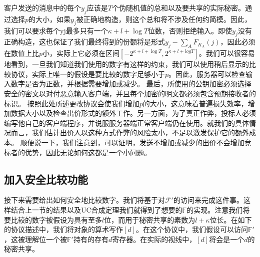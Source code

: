 客户发送的消息中的每个$y_j$应该是$T$个伪随机值的总和以及要共享的实际秘密。通过选择$p$的大小，如果$y_j$被正确地构造，则这个总和将不涉及任何约简模。因此，我们可以要求每个yj最多只有一个$\kappa+l+\log T$位数，否则拒绝输入。即使$y_j$没有正确构造，这也保证了我们最终得到的份额将是形式$y_j-\sum_{A}F_{K_A}(j)$，因此必须在数值上比$p$小，实际上它必须在区间$[-2^{\kappa+l+\log T},2^{\kappa+l+log T}]$。我们可以很容易地看到，一旦我们知道我们使用的数字有这样的约束，我们可以使用稍后显示的比较协议，实际上唯一的假设是要比较的数字足够小于$p$。因此，服务器可以检查输入数字是否为正数，并根据需要增加或减少。
最后，所使用的公钥加密必须选择安全的密文以对付恶意输入客户端，并且每个加密的明文都必须包含预期接收者的标识。
按照此处所述更改协议会使我们增加$p$的大小，这意味着普遍损失效率，增加数据大小以及检查出价形式的额外工作。另一方面，为了真正作弊，投标人必须编写他自己的客户端程序，并说服服务器端正常客户端仍在使用。就我们的具体情况而言，我们估计出价人以这种方式作弊的风险太小，不足以激发保护它的额外成本。
顺便说一下，我们注意到，可以证明，发送不增加或减少的出价不会增加竞标者的优势，因此无论如何这都是一个小问题。

\subsection{加入安全比较功能}
接下来需要给出如何安全地比较数字。我们将基于对$\mathcal{F}'$的访问来完成这件事。这样结合上一节的结果以及UC合成定理我们就得到了想要的$\mathbb{F}$的实现。注意我们将要比较的数字被假设为具有至多$l$位，而用于秘密共享的素数为$l+\kappa$位长。在如下的协议描述中，我们将对象的算术写作$[d]$。在这个协议中，我们假设可以访问$\mathbb{F}'$，这被理解位一个被$\mathbb{F}'$持有的存有$d$寄存器。在实际的视线中，$[d]$将会是一个$d$的秘密共享。

